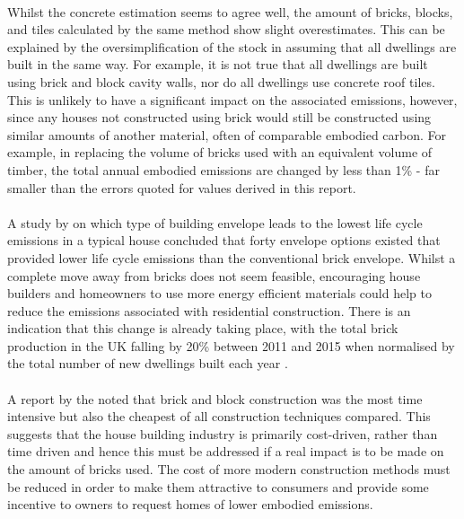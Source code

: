 \documentclass[12pt]{article}
\begin{document}
\paragraph{}
Whilst the concrete estimation seems to agree well, the amount of bricks, blocks, and tiles calculated by the same method show slight overestimates. This can be explained by the oversimplification of the stock in assuming that all dwellings are built in the same way. For example, it is not true that all dwellings are built using brick and block cavity walls, nor do all dwellings use concrete roof tiles. This is unlikely to have a significant impact on the associated emissions, however, since any houses not constructed using brick would still be constructed using similar amounts of another material, often of comparable embodied carbon. For example, in replacing the volume of bricks used with an equivalent volume of timber, the total annual embodied emissions are changed by less than 1\% - far smaller than the errors quoted for values derived in this report.

\paragraph{}
A study by \citet{Lawania2016-er} on which type of building envelope leads to the lowest life cycle emissions in a typical house concluded that forty envelope options existed that provided lower life cycle emissions than the conventional brick envelope. Whilst a complete move away from bricks does not seem feasible, encouraging house builders and homeowners to use more energy efficient materials could help to reduce the emissions associated with residential construction. There is an indication that this change is already taking place, with the total brick production in the UK falling by 20\% between 2011 and 2015 when normalised by the total number of new dwellings built each year \citep{Ministry_of_Housing_Communities2012-zw,Department_for_Business_Energy_Industrial_Strategy2019-va}. 

\paragraph{}
A report by the \citet{National_Audit_Office2005-mw} noted that brick and block construction was the most time intensive but also the cheapest of all construction techniques compared. This suggests that the house building industry is primarily cost-driven, rather than time driven and hence this must be addressed if a real impact is to be made on the amount of bricks used. The cost of more modern construction methods must be reduced in order to make them attractive to consumers and provide some incentive to owners to request homes of lower embodied emissions.
\end{document}
